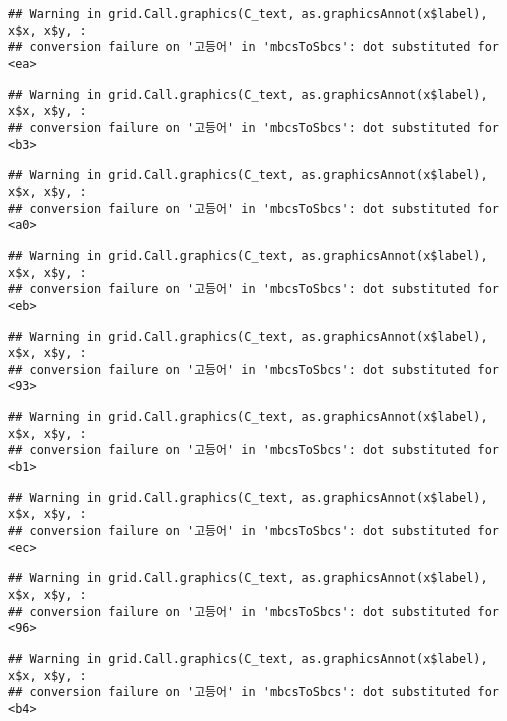 \documentclass[
]{article}
\begin{document}
\begin{verbatim}
## Warning in grid.Call.graphics(C_text, as.graphicsAnnot(x$label), x$x, x$y, :
## conversion failure on '고등어' in 'mbcsToSbcs': dot substituted for <ea>
\end{verbatim}

\begin{verbatim}
## Warning in grid.Call.graphics(C_text, as.graphicsAnnot(x$label), x$x, x$y, :
## conversion failure on '고등어' in 'mbcsToSbcs': dot substituted for <b3>
\end{verbatim}

\begin{verbatim}
## Warning in grid.Call.graphics(C_text, as.graphicsAnnot(x$label), x$x, x$y, :
## conversion failure on '고등어' in 'mbcsToSbcs': dot substituted for <a0>
\end{verbatim}

\begin{verbatim}
## Warning in grid.Call.graphics(C_text, as.graphicsAnnot(x$label), x$x, x$y, :
## conversion failure on '고등어' in 'mbcsToSbcs': dot substituted for <eb>
\end{verbatim}

\begin{verbatim}
## Warning in grid.Call.graphics(C_text, as.graphicsAnnot(x$label), x$x, x$y, :
## conversion failure on '고등어' in 'mbcsToSbcs': dot substituted for <93>
\end{verbatim}

\begin{verbatim}
## Warning in grid.Call.graphics(C_text, as.graphicsAnnot(x$label), x$x, x$y, :
## conversion failure on '고등어' in 'mbcsToSbcs': dot substituted for <b1>
\end{verbatim}

\begin{verbatim}
## Warning in grid.Call.graphics(C_text, as.graphicsAnnot(x$label), x$x, x$y, :
## conversion failure on '고등어' in 'mbcsToSbcs': dot substituted for <ec>
\end{verbatim}

\begin{verbatim}
## Warning in grid.Call.graphics(C_text, as.graphicsAnnot(x$label), x$x, x$y, :
## conversion failure on '고등어' in 'mbcsToSbcs': dot substituted for <96>
\end{verbatim}

\begin{verbatim}
## Warning in grid.Call.graphics(C_text, as.graphicsAnnot(x$label), x$x, x$y, :
## conversion failure on '고등어' in 'mbcsToSbcs': dot substituted for <b4>
\end{verbatim}
\end{document}
